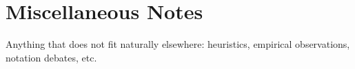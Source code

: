 \documentclass[11pt]{article}
\theoremstyle{plain}
\theoremstyle{definition}
\theoremstyle{remark}
\newcommand{\1}{\mathbf{1}}
\begin{document}
\section{Miscellaneous Notes}

Anything that does not fit naturally elsewhere: heuristics, empirical
observations, notation debates, etc.


\end{document}
